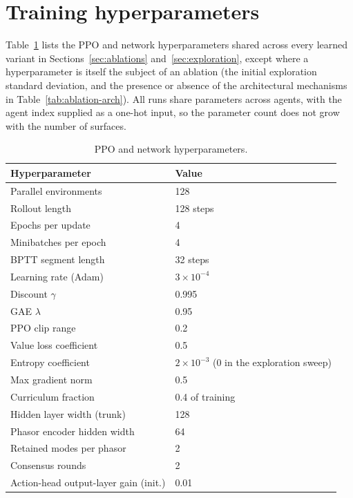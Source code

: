 \documentclass[preprint,11pt,authoryear]{elsarticle}
\begin{document}
\section{Training hyperparameters}
\label{app:hyperparameters}

Table~\ref{tab:params-ppo} lists the PPO and network hyperparameters shared
across every learned variant in Sections~\ref{sec:ablations}
and~\ref{sec:exploration}, except where a hyperparameter is itself the subject
of an ablation (the initial exploration standard deviation, and the presence or
absence of the architectural mechanisms in Table~\ref{tab:ablation-arch}). All
runs share parameters across agents, with the agent index supplied as a one-hot
input, so the parameter count does not grow with the number of surfaces.

\begin{table}[h]
\centering
\caption{PPO and network hyperparameters.}
\label{tab:params-ppo}
\begin{tabular}{@{}lp{5.6cm}@{}}
\toprule
Hyperparameter & Value \\
\midrule
Parallel environments & 128 \\
Rollout length & 128 steps \\
Epochs per update & 4 \\
Minibatches per epoch & 4 \\
BPTT segment length & 32 steps \\
Learning rate (Adam) & $3\times 10^{-4}$ \\
Discount $\gamma$ & 0.995 \\
GAE $\lambda$ & 0.95 \\
PPO clip range & 0.2 \\
Value loss coefficient & 0.5 \\
Entropy coefficient & $2\times 10^{-3}$ (0 in the exploration sweep) \\
Max gradient norm & 0.5 \\
Curriculum fraction & 0.4 of training \\
Hidden layer width (trunk) & 128 \\
Phasor encoder hidden width & 64 \\
Retained modes per phasor & 2 \\
Consensus rounds & 2 \\
Action-head output-layer gain (init.) & 0.01 \\
\bottomrule
\end{tabular}
\end{table}
\end{document}

